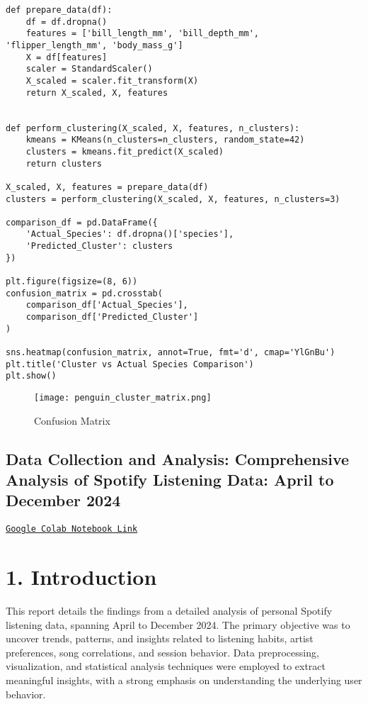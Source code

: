 \documentclass[12pt]{article}
\begin{document}
\begin{itemize}
\begin{lstlisting}
def prepare_data(df):
    df = df.dropna()
    features = ['bill_length_mm', 'bill_depth_mm', 'flipper_length_mm', 'body_mass_g']
    X = df[features]
    scaler = StandardScaler()
    X_scaled = scaler.fit_transform(X)
    return X_scaled, X, features


def perform_clustering(X_scaled, X, features, n_clusters):
    kmeans = KMeans(n_clusters=n_clusters, random_state=42)
    clusters = kmeans.fit_predict(X_scaled)
    return clusters

X_scaled, X, features = prepare_data(df)
clusters = perform_clustering(X_scaled, X, features, n_clusters=3)

comparison_df = pd.DataFrame({
    'Actual_Species': df.dropna()['species'],
    'Predicted_Cluster': clusters
})

plt.figure(figsize=(8, 6))
confusion_matrix = pd.crosstab(
    comparison_df['Actual_Species'], 
    comparison_df['Predicted_Cluster']
)

sns.heatmap(confusion_matrix, annot=True, fmt='d', cmap='YlGnBu')
plt.title('Cluster vs Actual Species Comparison')
plt.show()
\end{lstlisting}
\begin{figure}[H]
    \centering
    \texttt{[image: penguin\_cluster\_matrix.png]}
    \caption{Confusion Matrix}
    \label{fig:enter-label}
\end{figure}

\pagebreak
\begin{center}
\section*{Data Collection and Analysis: Comprehensive Analysis of Spotify Listening Data: April to December 2024}
\href{https://colab.research.google.com/drive/1SiAznpjyErzbzoyA8r2L4zOqpUfBzYaz?usp=sharing}{\texttt{Google Colab Notebook Link}}
\end{center}

\section*{1. Introduction}
This report details the findings from a detailed analysis of personal Spotify listening data, spanning April to December 2024. The primary objective was to uncover trends, patterns, and insights related to listening habits, artist preferences, song correlations, and session behavior. Data preprocessing, visualization, and statistical analysis techniques were employed to extract meaningful insights, with a strong emphasis on understanding the underlying user behavior.


\end{itemize}
\end{document}

